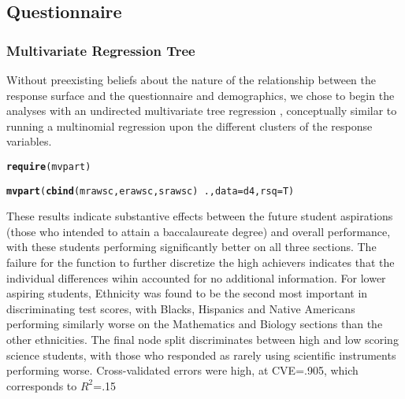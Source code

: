 \documentclass{article}\usepackage[]{graphicx}\usepackage[]{color}
\makeatletter
\newcommand{\hlopt}[1]{\textcolor[rgb]{0,0,0}{#1}}%
\newcommand{\hlstd}[1]{\textcolor[rgb]{0.345,0.345,0.345}{#1}}%
\newcommand{\hlkwc}[1]{\textcolor[rgb]{0.333,0.667,0.333}{#1}}%
\newcommand{\hlkwd}[1]{\textcolor[rgb]{0.737,0.353,0.396}{\textbf{#1}}}%
\newenvironment{kframe}{%
 \def\at@end@of@kframe{}%
 \ifinner\ifhmode%
  \def\at@end@of@kframe{\end{minipage}}%
  \begin{minipage}{\columnwidth}%
 \fi\fi%
 \def\FrameCommand##1{\hskip\@totalleftmargin \hskip-\fboxsep
 \colorbox{shadecolor}{##1}\hskip-\fboxsep
     \hskip-\linewidth \hskip-\@totalleftmargin \hskip\columnwidth}%
 \MakeFramed {\advance\hsize-\width
   \@totalleftmargin\z@ \linewidth\hsize
   \@setminipage}}%
 {\par\unskip\endMakeFramed%
 \at@end@of@kframe}
\newenvironment{knitrout}{}{} %
\makeatother
\begin{document}
\subsection{Questionnaire}
\subsubsection{Multivariate Regression Tree}
Without preexisting beliefs about the nature of the relationship between the response surface and the questionnaire and demographics, we chose to begin the analyses with an undirected multivariate tree regression \cite{De'ath}, conceptually similar to running a multinomial regression upon the different clusters of the response variables. 

\begin{knitrout}
\color{fgcolor}\begin{kframe}
\begin{alltt}
\hlkwd{require}\hlstd{(mvpart)}
\end{alltt}


{\ttfamily\noindent\itshape\color{messagecolor}{\#\# Loading required package: mvpart}}\begin{alltt}
\hlkwd{mvpart}\hlstd{(}\hlkwd{cbind}\hlstd{(mrawsc, erawsc, srawsc)} \hlopt{~} \hlstd{.,} \hlkwc{data} \hlstd{= d4,} \hlkwc{rsq} \hlstd{= T)}
\end{alltt}


{\ttfamily\noindent\bfseries\color{errorcolor}{\#\# Error: object 'd4' not found}}\end{kframe}
\end{knitrout}


These results indicate substantive effects between the future student aspirations (those who intended to attain a baccalaureate degree) and overall performance, with these students performing significantly better on all three sections. The failure for the function to further discretize the high achievers indicates that the individual differences wihin accounted for no additional information. For lower aspiring students, Ethnicity was found to be the second most important in discriminating test scores, with Blacks, Hispanics and Native Americans performing similarly worse on the Mathematics and Biology sections than the other ethnicities. The final node split discriminates between high and low scoring science students, with those who responded as rarely using scientific instruments performing worse. Cross-validated errors were high, at CVE=.905, which corresponds to $R^2$=.15
\end{document}

